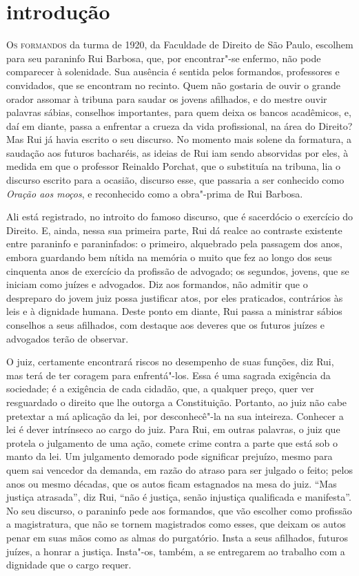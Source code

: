 \chapter[Introdução, por Pedro Luso]{introdução}

\textsc{Os formandos} da turma de 1920, da Faculdade de Direito de São Paulo,
escolhem para seu paraninfo Rui Barbosa, que, por encontrar"-se enfermo,
não pode comparecer à solenidade. Sua ausência é sentida
pelos formandos, professores e convidados, que se encontram no recinto.
Quem não gostaria de ouvir o grande orador assomar à tribuna para
saudar os jovens afilhados, e do mestre ouvir palavras sábias,
conselhos importantes, para quem deixa os bancos acadêmicos, e, daí em
diante, passa a enfrentar a crueza da vida profissional, na área do
Direito? Mas Rui já havia escrito o seu discurso. No momento mais
solene da formatura, a saudação aos futuros bacharéis, as ideias de Rui
iam sendo absorvidas por eles, à medida em que o professor Reinaldo
Porchat, que o substituía na tribuna, lia o discurso escrito para a
ocasião, discurso esse, que passaria a ser conhecido como \textit{Oração aos
moços}, e reconhecido como a obra"-prima de Rui Barbosa. 

Ali está registrado, no introito do
famoso discurso, que é sacerdócio o exercício do Direito. E, ainda,
nessa sua primeira parte, Rui dá realce ao contraste existente entre
paraninfo e paraninfados: o primeiro, alquebrado pela passagem dos
anos, embora guardando bem nítida na memória o muito que fez ao longo
dos seus cinquenta anos de exercício da profissão de advogado; os
segundos, jovens, que se iniciam como juízes e advogados. Diz aos
formandos, não admitir que o despreparo do jovem juiz possa justificar
atos, por eles praticados, contrários às leis e à dignidade humana.
Deste ponto em diante, Rui passa a ministrar
sábios conselhos a seus afilhados, com destaque aos deveres que os
futuros juízes e advogados terão de observar. 

O juiz, certamente encontrará riscos no desempenho de suas funções, diz
Rui, mas terá de ter coragem para enfrentá"-los. Essa é uma sagrada
exigência da sociedade; é a exigência de cada cidadão, que, a qualquer
preço, quer ver resguardado o direito que lhe outorga a Constituição.
Portanto, ao juiz não cabe pretextar a má aplicação da lei, por
desconhecê"-la na sua inteireza. Conhecer a lei é dever intrínseco ao
cargo do juiz. Para Rui, em outras palavras, o juiz que protela o
julgamento de uma ação, comete crime contra a parte que está sob o
manto da lei. Um julgamento demorado pode significar prejuízo, mesmo
para quem sai vencedor da demanda, em razão do atraso para ser julgado
o feito; pelos anos ou mesmo décadas, que os autos ficam estagnados na
mesa do juiz. ``Mas justiça atrasada'', diz Rui, ``não é justiça, senão
injustiça qualificada e manifesta''. No seu discurso, o paraninfo pede
aos formandos, que vão escolher como profissão a magistratura, que não
se tornem magistrados como esses, que deixam os autos penar em suas
mãos como as almas do purgatório. Insta a seus afilhados, futuros
juízes, a honrar a justiça. Insta"-os, também, a se entregarem ao
trabalho com a dignidade que o cargo requer. 

